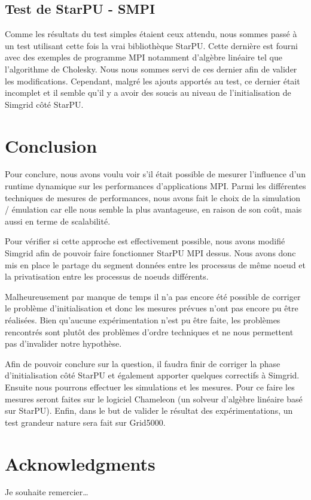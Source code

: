 \documentclass[smallextended]{svjour3}
\begin{document}
\subsection{Test de StarPU - SMPI}
\label{sec-6-2}
Comme les résultats du test simples étaient ceux attendu, nous
sommes passé à un test utilisant cette fois la vrai bibliothèque
StarPU. Cette dernière est fourni avec des exemples de programme MPI
notamment d'algèbre linéaire tel que l'algorithme de Cholesky. Nous
nous sommes servi de ces dernier afin de valider les
modifications. Cependant, malgré les ajouts apportés au test, ce 
dernier était incomplet et il semble qu'il y a avoir des soucis au
niveau de  l'initialisation de Simgrid côté StarPU.

\section{Conclusion}
\label{sec-7}
Pour conclure, nous avons voulu voir s'il était possible de mesurer
l'influence d'un runtime dynamique sur les performances
d'applications MPI. Parmi les différentes techniques de mesures de
performances, nous avons fait le choix de la simulation / émulation
car elle nous semble la plus avantageuse, en raison de son coût,
mais aussi en terme de scalabilité.  

Pour vérifier si cette approche est effectivement possible, nous
avons modifié Simgrid afin de pouvoir faire fonctionner StarPU MPI
dessus. Nous avons donc mis en place le partage du segment données
entre les processus de même noeud et la privatisation entre les
processus de noeuds différents. 

Malheureusement par manque de temps il n'a pas encore été possible
de corriger le problème d'initialisation et donc les mesures prévues
n'ont pas encore pu être réalisées. Bien qu'aucune expérimentation
n'est pu être faite, les problèmes rencontrés sont plutôt des
problèmes d'ordre techniques et ne nous permettent pas d'invalider
notre hypothèse. 

Afin de pouvoir conclure sur la question, il faudra finir de
corriger la phase d'initialisation côté StarPU et également apporter
quelques correctifs à Simgrid. Ensuite nous pourrons effectuer les
simulations et les mesures. Pour ce faire les mesures seront faites
sur le logiciel Chameleon (un solveur d'algèbre linéaire basé sur
StarPU). Enfin, dans le but de valider le résultat des
expérimentations, un test grandeur nature sera fait sur Grid5000.


\section*{Acknowledgments}
Je souhaite remercier\ldots{}

\nocite{*}
\def\raggedright{}


\end{document}
